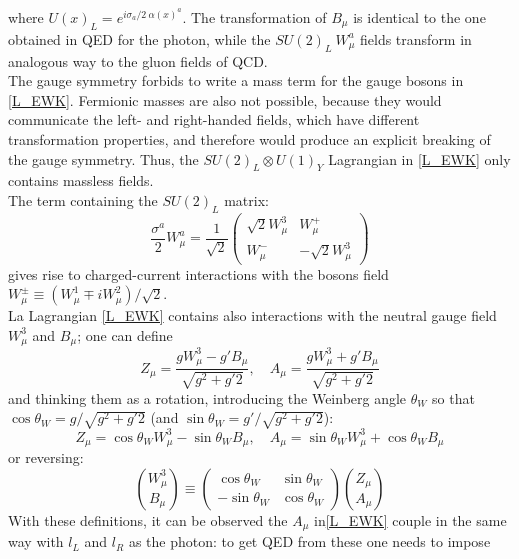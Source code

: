 where $U(x)_{L} = e^{i\sigma_{a} / 2\ \alpha(x)^{a}}$. The transformation of $B_{\mu}$ is identical to the one obtained in QED for the photon, while the $SU(2)_{L}\ W^{a}_{\mu}$ fields transform in analogous way to the gluon fields of QCD. \\
The gauge symmetry forbids to write a mass term for the gauge bosons in \ref{L_EWK}. Fermionic masses are also not possible, because they would communicate the left- and right-handed fields, which have different transformation properties, and therefore would produce an explicit breaking of the gauge symmetry. Thus, the $SU(2)_{L} \otimes U(1)_{Y}$ Lagrangian in \ref{L_EWK} only contains massless fields.\\
The term containing the $SU(2)_{L}$ matrix:
\begin{equation}
\frac{\sigma^{a}}{2}W_{\mu}^{a} = \frac{1}{\sqrt{2}}\begin{pmatrix} \sqrt{2}W^{3}_{\mu} & W_{\mu}^{+} \\ W_{\mu}^{-} & - \sqrt{2}W^{3}_{\mu} \end{pmatrix}
\end{equation}
gives rise to charged-current interactions with the bosons field $W_{\mu}^{\pm} \equiv (W^{1}_{\mu} \mp iW^{2}_{\mu}) / \sqrt{2}$. \\
La Lagrangian \ref{L_EWK}  contains also interactions with the neutral gauge field $W^{3}_{\mu}$ and $B_{\mu}$; one can define
\begin{equation}
Z_{\mu} = \frac{gW^{3}_{\mu} - g'B_{\mu}}	{\sqrt{g^{2}+g'{2}}}, \quad A_{\mu} = \frac{gW^{3}_{\mu} + g'B_{\mu}}	{\sqrt{g^{2}+g'{2}}}
\label{A_Z}
\end{equation}
and thinking them as a rotation, introducing the Weinberg angle $\theta_{W}$ so that $\cos\theta_{W} = g/{\sqrt{g^{2}+g'{2}}}$ (and $\sin\theta_{W} = g'/{\sqrt{g^{2}+g'{2}}}$):
\begin{equation}
Z_{\mu} = \cos\theta_{W}W^{3}_{\mu} - \sin\theta_{W}B_{\mu}, \quad A_{\mu} = \sin\theta_{W}W^{3}_{\mu} + \cos\theta_{W}B_{\mu}
\label{A_Z_2}
\end{equation}
or reversing:
\begin{equation}
{W^{3}_{\mu} \choose B_{\mu}} \equiv \begin{pmatrix} \cos\theta_{W} & \sin\theta_{W} \\ -\sin\theta_{W} & \cos\theta_{W} \end{pmatrix} {Z_{\mu} \choose A_{\mu}}
\label{W_B_A_Z}
\end{equation}
With these definitions, it can be observed the $A_{\mu}$ in\ref{L_EWK} couple in the same way with $l_{L}$ and $l_{R}$ as the photon: to get QED from these one needs to impose
